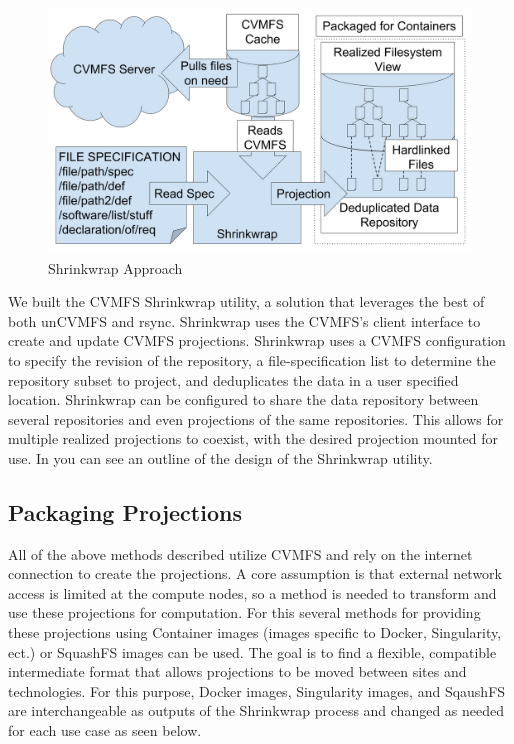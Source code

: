 \documentclass[sigconf]{acmart}
\begin{document}
\begin{figure}[h]
\includegraphics[width=\columnwidth]{drawings/shrinkwrap-structure.png}
\caption{Shrinkwrap Approach}
\label{figure:shrinkwrap-arch}
\end{figure}

We built the CVMFS Shrinkwrap utility,
a solution that leverages the best of both
unCVMFS and rsync.
Shrinkwrap uses the CVMFS's client interface to
create and update CVMFS projections.
Shrinkwrap uses a CVMFS configuration to specify the
revision of the repository, a file-specification list
to determine the repository subset to project, and
deduplicates the data in a user specified location.
Shrinkwrap can be configured to share the data
repository between several repositories and even
projections of the same repositories.
This allows for multiple realized projections
to coexist, with the desired projection
mounted for use.
In  you can see an outline
of the design of the Shrinkwrap utility.

\subsection{Packaging Projections}

All of the above methods described utilize CVMFS
and rely on the internet connection to create
the projections.
A core assumption is that external network
access is limited at the compute nodes, so a method
is needed to transform and use these projections
for computation.
For this several methods for providing
these projections using 
Container images (images specific to Docker, Singularity, ect.)
or SquashFS images can be used.
The goal is to find a flexible, compatible intermediate
format that allows projections to be moved between sites
and technologies.
For this purpose, Docker images, Singularity images, and 
SqaushFS are interchangeable as outputs of the Shrinkwrap process
and changed as needed for each use case as seen below.
\end{document}
